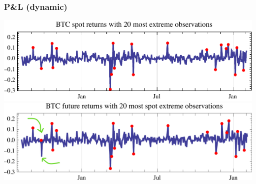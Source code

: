 \documentclass[10pt,mathserif]{beamer}
\renewcommand{\(}{\begin{columns}}
\renewcommand{\)}{\end{columns}}
\newcommand{\<}[1]{\begin{column}{#1}}
\renewcommand{\>}{\end{column}}
\theoremstyle{definition}
\begin{document}


\begin{frame}
  \frametitle{P\&L (dynamic)}
  \begin{center}
    \includegraphics[scale=1]{../_pics/BTCspot_with_extremes.pdf}\\
    \includegraphics[scale=.3325]{../_pics/BTCfuture_with_extremes_annotated.pdf-crop.pdf}
  \end{center}
\end{frame}
\end{document}
